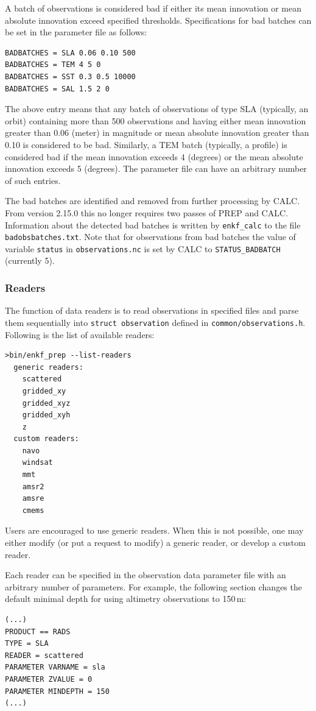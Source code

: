 \documentclass[11pt]{report}
\begin{document}
A batch of observations is considered bad if either its mean innovation or mean absolute innovation exceed specified thresholds.
Specifications for bad batches can be set in the parameter file as follows:
\begin{Verbatim}[frame=single,fontsize=\footnotesize]
BADBATCHES = SLA 0.06 0.10 500
BADBATCHES = TEM 4 5 0
BADBATCHES = SST 0.3 0.5 10000
BADBATCHES = SAL 1.5 2 0
\end{Verbatim}
The above entry means that any batch of observations of type SLA (typically, an orbit) containing more than 500 observations and having either mean innovation greater than 0.06 (meter) in magnitude or mean absolute innovation greater than 0.10 is considered to be bad.
Similarly, a TEM batch (typically, a profile) is considered bad if the mean innovation exceeds 4 (degrees) or the mean absolute innovation exceeds 5 (degrees).
The parameter file can have an arbitrary number of such entries.

The bad batches are identified and removed from further processing by CALC.
From version 2.15.0 this no longer requires two passes of PREP and CALC.
Information about the detected bad batches is written by \verb|enkf_calc| to the file \verb|badobsbatches.txt|.
Note that for observations from bad batches the value of variable \verb|status| in \verb|observations.nc| is set by CALC to \verb|STATUS_BADBATCH| (currently 5).

\subsubsection{Readers}

The function of data readers is to read observations in specified files and parse them sequentially into \verb|struct observation| defined in \verb|common/observations.h|.
Following is the list of available readers:
\begin{Verbatim}
>bin/enkf_prep --list-readers
  generic readers:
    scattered
    gridded_xy
    gridded_xyz
    gridded_xyh
    z
  custom readers:
    navo
    windsat
    mmt
    amsr2
    amsre
    cmems
\end{Verbatim}

Users are encouraged to use generic readers.
When this is not possible, one may either modify (or put a request to modify) a generic reader, or develop a custom reader.

Each reader can be specified in the observation data parameter file with an arbitrary number of parameters.
For example, the following section changes the default minimal depth for using altimetry observations to 150\,m:
\begin{Verbatim}
(...)
PRODUCT == RADS
TYPE = SLA
READER = scattered
PARAMETER VARNAME = sla
PARAMETER ZVALUE = 0
PARAMETER MINDEPTH = 150
(...)
\end{Verbatim}
\end{document}
